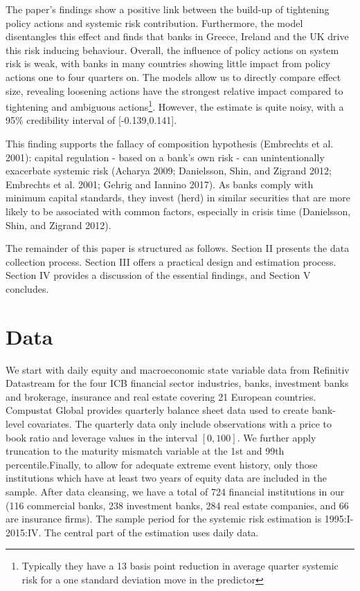 \documentclass[
  10pt,
]{article}
\begin{document}
The paper's findings show a positive link between the build-up of
tightening policy actions and systemic risk contribution. Furthermore,
the model disentangles this effect and finds that banks in Greece,
Ireland and the UK drive this risk inducing behaviour. Overall, the
influence of policy actions on system risk is weak, with banks in many
countries showing little impact from policy actions one to four quarters
on. The models allow us to directly compare effect size, revealing
loosening actions have the strongest relative impact compared to
tightening and ambiguous actions\footnote{Typically they have a 13 basis
  point reduction in average quarter systemic risk for a one standard
  deviation move in the predictor}. However, the estimate is quite
noisy, with a 95\% credibility interval of {[}-0.139,0.141{]}.

This finding supports the fallacy of composition hypothesis (Embrechts
et al. 2001): capital regulation - based on a bank's own risk - can
unintentionally exacerbate systemic risk (Acharya 2009; Danielsson,
Shin, and Zigrand 2012; Embrechts et al. 2001; Gehrig and Iannino 2017).
As banks comply with minimum capital standards, they invest (herd) in
similar securities that are more likely to be associated with common
factors, especially in crisis time (Danielsson, Shin, and Zigrand 2012).

The remainder of this paper is structured as follows. Section II
presents the data collection process. Section III offers a practical
design and estimation process. Section IV provides a discussion of the
essential findings, and Section V concludes.

\hypertarget{data}{%
\section{Data}\label{data}}

We start with daily equity and macroeconomic state variable data from
Refinitiv Datastream for the four ICB financial sector industries,
banks, investment banks and brokerage, insurance and real estate
covering 21 European countries. Compustat Global provides quarterly
balance sheet data used to create bank-level covariates. The quarterly
data only include observations with a price to book ratio and leverage
values in the interval \([0, 100]\). We further apply truncation to the
maturity mismatch variable at the 1st and 99th percentile.Finally, to
allow for adequate extreme event history, only those institutions which
have at least two years of equity data are included in the sample. After
data cleansing, we have a total of 724 financial institutions in our
(116 commercial banks, 238 investment banks, 284 real estate companies,
and 66 are insurance firms). The sample period for the systemic risk
estimation is 1995:I-2015:IV. The central part of the estimation uses
daily data.
\end{document}
